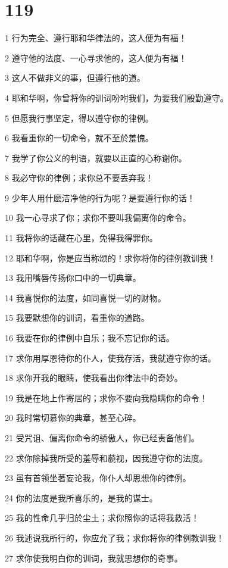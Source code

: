 \chapter{119}

\par 1 行为完全、遵行耶和华律法的，这人便为有福！
\par 2 遵守他的法度、一心寻求他的，这人便为有福！
\par 3 这人不做非义的事，但遵行他的道。
\par 4 耶和华啊，你曾将你的训词吩咐我们，为要我们殷勤遵守。
\par 5 但愿我行事坚定，得以遵守你的律例。
\par 6 我看重你的一切命令，就不至於羞愧。
\par 7 我学了你公义的判语，就要以正直的心称谢你。
\par 8 我必守你的律例；求你总不要丢弃我！
\par 9 少年人用什麽洁净他的行为呢？是要遵行你的话！
\par 10 我一心寻求了你；求你不要叫我偏离你的命令。
\par 11 我将你的话藏在心里，免得我得罪你。
\par 12 耶和华啊，你是应当称颂的！求你将你的律例教训我！
\par 13 我用嘴唇传扬你口中的一切典章。
\par 14 我喜悦你的法度，如同喜悦一切的财物。
\par 15 我要默想你的训词，看重你的道路。
\par 16 我要在你的律例中自乐；我不忘记你的话。
\par 17 求你用厚恩待你的仆人，使我存活，我就遵守你的话。
\par 18 求你开我的眼睛，使我看出你律法中的奇妙。
\par 19 我是在地上作寄居的；求你不要向我隐瞒你的命令！
\par 20 我时常切慕你的典章，甚至心碎。
\par 21 受咒诅、偏离你命令的骄傲人，你已经责备他们。
\par 22 求你除掉我所受的羞辱和藐视，因我遵守你的法度。
\par 23 虽有首领坐著妄论我，你仆人却思想你的律例。
\par 24 你的法度是我所喜乐的，是我的谋士。
\par 25 我的性命几乎归於尘土；求你照你的话将我救活！
\par 26 我述说我所行的，你应允了我；求你将你的律例教训我！
\par 27 求你使我明白你的训词，我就思想你的奇事。
